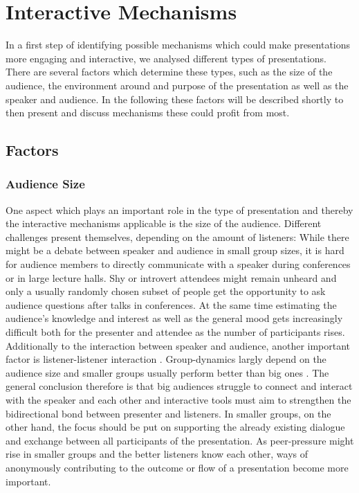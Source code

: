 \chapter{Interactive Mechanisms}
\label{cha:mechanisms}

In a first step of identifying possible mechanisms which could make presentations more engaging and interactive, we analysed different types of presentations. There are several factors which determine these types, such as the size of the audience, the environment around and purpose of the presentation as well as the speaker and audience. In the following these factors will be described shortly to then present and discuss mechanisms these could profit from most.

\section{Factors}

\subsection{Audience Size}
One aspect which plays an important role in the type of presentation and thereby the interactive mechanisms applicable is the size of the audience. Different challenges present themselves, depending on the amount of listeners: While there might be a debate between speaker and audience in small group sizes, it is hard for audience members to directly communicate with a speaker during conferences or in large lecture halls. Shy or introvert attendees might remain unheard \cite{Bry:Backstage} and only a usually randomly chosen subset of people get the opportunity to ask audience questions after talks in conferences. At the same time estimating the audience's knowledge and interest as well as the general mood gets increasingly difficult both for the presenter and attendee as the number of participants rises. Additionally to the interaction between speaker and audience, another important factor is listener-listener interaction \cite{Moore:ThreeTypesOfInteraction}. Group-dynamics largly depend on the audience size and smaller groups usually perform better than big ones \cite{Phillips:GroupProblemSolving}.
The general conclusion therefore is that big audiences struggle to connect and interact with the speaker and each other and interactive tools must aim to strengthen the bidirectional bond between presenter and listeners. In smaller groups, on the other hand, the focus should be put on supporting the already existing dialogue and exchange between all participants of the presentation. As peer-pressure might rise in smaller groups and the better listeners know each other, ways of anonymously contributing to the outcome or flow of a presentation become more important.

